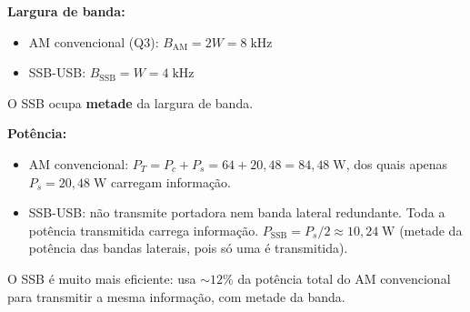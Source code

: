 \documentclass[11pt,a4paper]{article}
\begin{document}
\begin{resolucao}

\textbf{Largura de banda:}
\begin{itemize}
  \item AM convencional (Q3): $B_{\text{AM}} = 2W = 8\;\text{kHz}$
  \item SSB-USB: $B_{\text{SSB}} = W = 4\;\text{kHz}$
\end{itemize}

O SSB ocupa \textbf{metade} da largura de banda.

\textbf{Potência:}
\begin{itemize}
  \item AM convencional: $P_T = P_c + P_s = 64 + 20{,}48 = 84{,}48\;\text{W}$, dos quais apenas $P_s = 20{,}48\;\text{W}$ carregam informação.
  \item SSB-USB: não transmite portadora nem banda lateral redundante. Toda a potência transmitida carrega informação. $P_{\text{SSB}} = P_s/2 \approx 10{,}24\;\text{W}$ (metade da potência das bandas laterais, pois só uma é transmitida).
\end{itemize}

O SSB é muito mais eficiente: usa $\sim 12\%$ da potência total do AM convencional para transmitir a mesma informação, com metade da banda.
\end{resolucao}
\end{document}
